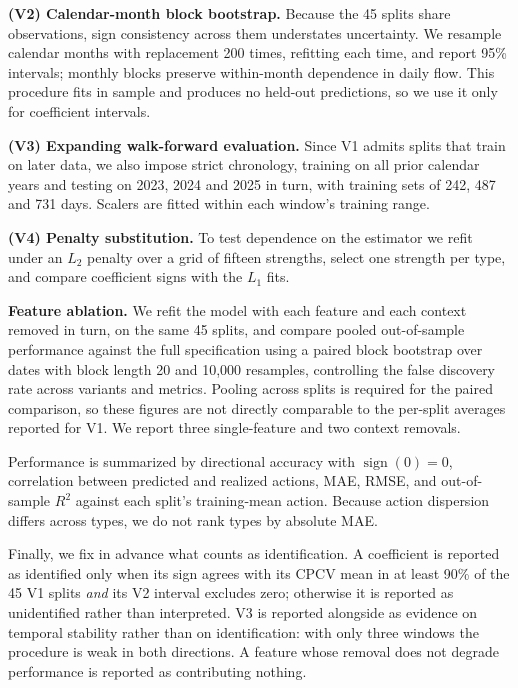 \textbf{(V2) Calendar-month block bootstrap.} Because the 45 splits share
observations, sign consistency across them understates uncertainty. We
resample calendar months with replacement 200 times, refitting each time,
and report 95\% intervals; monthly blocks preserve within-month
dependence in daily flow. This procedure fits in sample and produces no
held-out predictions, so we use it only for coefficient intervals.

\textbf{(V3) Expanding walk-forward evaluation.} Since V1 admits splits
that train on later data, we also impose strict chronology, training on
all prior calendar years and testing on 2023, 2024 and 2025 in turn, with
training sets of 242, 487 and 731 days. Scalers are fitted within each
window's training range.

\textbf{(V4) Penalty substitution.} To test dependence on the estimator
we refit under an $L_2$ penalty over a grid of fifteen strengths, select
one strength per type, and compare coefficient signs with the $L_1$ fits.

\textbf{Feature ablation.} We refit the model with each feature and each
context removed in turn, on the same 45 splits, and compare pooled
out-of-sample performance against the full specification using a paired
block bootstrap over dates with block length 20 and 10{,}000 resamples,
controlling the false discovery rate across variants and metrics. Pooling
across splits is required for the paired comparison, so these figures are
not directly comparable to the per-split averages reported for V1. We
report three single-feature and two context removals.

Performance is summarized by directional accuracy with
$\operatorname{sign}(0) = 0$, correlation between predicted and realized
actions, MAE, RMSE, and out-of-sample $R^2$ against each split's
training-mean action. Because action dispersion differs across types, we
do not rank types by absolute MAE.

Finally, we fix in advance what counts as identification. A coefficient
is reported as identified only when its sign agrees with its CPCV mean in
at least 90\% of the 45 V1 splits \emph{and} its V2 interval excludes
zero; otherwise it is reported as unidentified rather than interpreted.
V3 is reported alongside as evidence on temporal stability rather than on
identification: with only three windows the procedure is weak in both
directions. A feature whose removal does not degrade performance is
reported as contributing nothing.
